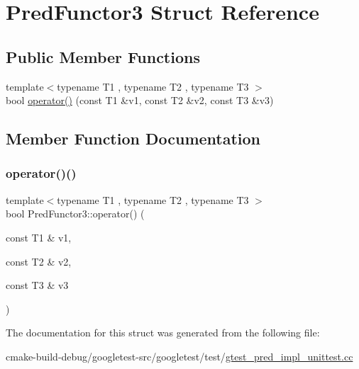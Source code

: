 \hypertarget{structPredFunctor3}{}\section{Pred\+Functor3 Struct Reference}
\label{structPredFunctor3}
\subsection*{Public Member Functions}
\begin{DoxyCompactItemize}
\item 
{\footnotesize template$<$typename T1 , typename T2 , typename T3 $>$ }\\bool \mbox{\hyperlink{structPredFunctor3_a08b0c59189570fb8eb7e2c7452fec995}{operator()}} (const T1 \&v1, const T2 \&v2, const T3 \&v3)
\end{DoxyCompactItemize}


\subsection{Member Function Documentation}
\mbox{\label{structPredFunctor3_a08b0c59189570fb8eb7e2c7452fec995}} 
\subsubsection{\texorpdfstring{operator()()}{operator()()}}
{\footnotesize\ttfamily template$<$typename T1 , typename T2 , typename T3 $>$ \\
bool Pred\+Functor3\+::operator() (\begin{DoxyParamCaption}\item[{const T1 \&}]{v1,  }\item[{const T2 \&}]{v2,  }\item[{const T3 \&}]{v3 }\end{DoxyParamCaption})\hspace{0.3cm}{\ttfamily [inline]}}



The documentation for this struct was generated from the following file\+:\begin{DoxyCompactItemize}
\item 
cmake-\/build-\/debug/googletest-\/src/googletest/test/\mbox{\hyperlink{gtest__pred__impl__unittest_8cc}{gtest\+\_\+pred\+\_\+impl\+\_\+unittest.\+cc}}\end{DoxyCompactItemize}
